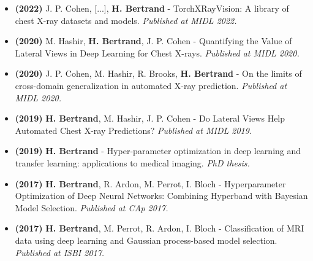 \documentclass[11pt,a4paper,sans]{moderncv}        %
\begin{document}
\begin{itemize}
    \item \textbf{(2022)} J. P. Cohen, [...], \textbf{H. Bertrand} - TorchXRayVision: A library of chest X-ray datasets and models. \textit{Published at MIDL 2022.}
    \item \textbf{(2020)} M. Hashir, \textbf{H. Bertrand}, J. P. Cohen - Quantifying the Value of Lateral Views in Deep Learning for Chest X-rays. \textit{Published at MIDL 2020.}
    \item \textbf{(2020)} J. P. Cohen, M. Hashir, R. Brooks, \textbf{H. Bertrand} - On the limits of cross-domain generalization in automated X-ray prediction. \textit{Published at MIDL 2020.}
    \item \textbf{(2019)} \textbf{H. Bertrand}, M. Hashir, J. P. Cohen - Do Lateral Views Help Automated Chest X-ray Predictions? \textit{Published at MIDL 2019.}
    \item \textbf{(2019)} \textbf{H. Bertrand} - Hyper-parameter optimization in deep learning and transfer learning: applications to medical imaging. \textit{PhD thesis.}
    \item \textbf{(2017)} \textbf{H. Bertrand}, R. Ardon, M. Perrot, I. Bloch - Hyperparameter Optimization of Deep Neural Networks: Combining Hyperband with Bayesian Model Selection. \textit{Published at CAp 2017.}
    \item \textbf{(2017)} \textbf{H. Bertrand}, M. Perrot, R. Ardon, I. Bloch - Classification of MRI data using deep learning and Gaussian process-based model selection. \textit{Published at ISBI 2017.}
\end{itemize}
\end{document}
